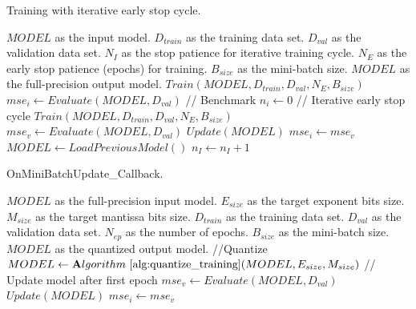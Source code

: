 \begin{algorithm}[h!]
	\label{alg:training}
	\caption{Training with iterative early stop cycle.}
	\begin{algorithmic}
		\SetAlgoLined
		\renewcommand{\algorithmicrequire}{\textbf{input:}}
		\renewcommand{\algorithmicensure}{\textbf{output:}}
		\REQUIRE $MODEL$ as the input model.
		\REQUIRE $D_{train}$ as the training data set.
		\REQUIRE $D_{val}$ as the validation data set.
		\REQUIRE $N_{I}$ as the stop patience for iterative training cycle.
		\REQUIRE $N_{E}$ as the early stop patience (epochs) for training.
		\REQUIRE $B_{size}$ as the mini-batch size.
		\ENSURE $MODEL$ as the full-precision output model.
		\STATE $Train(MODEL, D_{train}, D_{val}, N_{E}, B_{size})$
		\STATE $mse_i \gets Evaluate(MODEL, D_{val})$ // Benchmark
		\STATE $n_i \gets 0$
		\STATE // Iterative early stop cycle
		\STATE $Train(MODEL, D_{train}, D_{val}, N_{E}, B_{size})$
		\STATE $mse_v \gets Evaluate(MODEL, D_{val})$
			\STATE $Update(MODEL)$
			\STATE $mse_i \gets mse_v$
		\ELSE
			\STATE $MODEL  \gets LoadPreviousModel()$
			\STATE $n_I \gets n_I + 1$
		\ENDIF
		\ENDWHILE
	\end{algorithmic}
\end{algorithm}


\begin{algorithm}[h!]
	\label{alg:quantization_integration}
	\caption{OnMiniBatchUpdate\_Callback.}
	\begin{algorithmic}
		\SetAlgoLined
		\renewcommand{\algorithmicrequire}{\textbf{input:}}
		\renewcommand{\algorithmicensure}{\textbf{output:}}
		\REQUIRE $MODEL$ as the full-precision input model.
		\REQUIRE $E_{size}$ as the target exponent bits size.
		\REQUIRE $M_{size}$ as the target mantissa bits size.
		\REQUIRE $D_{train}$ as the training data set.
		\REQUIRE $D_{val}$ as the validation data set.
		\REQUIRE $N_{ep}$ as the number of epochs.
		\REQUIRE $B_{size}$ as the mini-batch size.
		\ENSURE $MODEL$ as the quantized output model.
		\STATE //Quantize
		\STATE $MODEL \gets \Algo{alg:quantize_training}(MODEL,E_{size}, M_{size})$ 
		\IF {$1<epoch$}
		\STATE // Update model after first epoch
		\STATE $mse_v \gets Evaluate(MODEL, D_{val})$
		\IF{$mse_v < mse_i$}
		\STATE $Update(MODEL)$
		\STATE $mse_i \gets mse_v$
		\ENDIF
		\ENDIF
	\end{algorithmic}
\end{algorithm}

